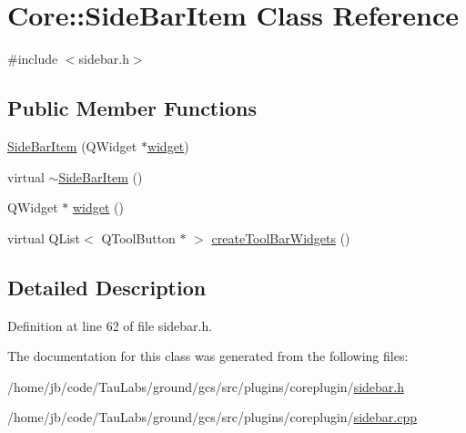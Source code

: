 \hypertarget{class_core_1_1_side_bar_item}{\section{\-Core\-:\-:\-Side\-Bar\-Item \-Class \-Reference}
\label{class_core_1_1_side_bar_item}
}


{\ttfamily \#include $<$sidebar.\-h$>$}

\subsection*{\-Public \-Member \-Functions}
\begin{DoxyCompactItemize}
\item 
\hyperlink{group___core_plugin_gabbb879ec14e6c2c6f45fe5470fc929fe}{\-Side\-Bar\-Item} (\-Q\-Widget $\ast$\hyperlink{group___core_plugin_ga59d9464feca7cdf98a15e9a5482cc858}{widget})
\item 
virtual \hyperlink{group___core_plugin_gae800a56747cc004c25c2b6a9e3b52efd}{$\sim$\-Side\-Bar\-Item} ()
\item 
\-Q\-Widget $\ast$ \hyperlink{group___core_plugin_ga59d9464feca7cdf98a15e9a5482cc858}{widget} ()
\item 
virtual \-Q\-List$<$ \-Q\-Tool\-Button $\ast$ $>$ \hyperlink{group___core_plugin_ga3bafb40a4a749f25a811178bd3dcb7d8}{create\-Tool\-Bar\-Widgets} ()
\end{DoxyCompactItemize}


\subsection{\-Detailed \-Description}


\-Definition at line 62 of file sidebar.\-h.



\-The documentation for this class was generated from the following files\-:\begin{DoxyCompactItemize}
\item 
/home/jb/code/\-Tau\-Labs/ground/gcs/src/plugins/coreplugin/\hyperlink{sidebar_8h}{sidebar.\-h}\item 
/home/jb/code/\-Tau\-Labs/ground/gcs/src/plugins/coreplugin/\hyperlink{sidebar_8cpp}{sidebar.\-cpp}\end{DoxyCompactItemize}
